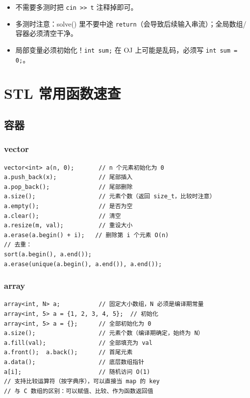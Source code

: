 \documentclass[UTF8,openany,oneside,zihao=-4]{ctexbook}
\newcommand{\inputnewboard}[1]{%
  {%
    \lstset{basicstyle=\newboardcodefont\small}%
  }%
}
\begin{document}
\begin{tip}
\begin{itemize}
  \item 不需要多测时把 \lstinline|cin >> t| 注释掉即可。
  \item 多测时注意：solve() 里不要中途 \lstinline|return|（会导致后续输入串流）；全局数组/容器必须清空干净。
  \item 局部变量必须初始化！\lstinline|int sum;| 在 OJ 上可能是乱码，必须写 \lstinline|int sum = 0;|。
\end{itemize}
\end{tip}

\inputnewboard{remake/large/01_模板.tex}

\chapter{STL 常用函数速查}

\section{容器}

\subsection{vector}
\begin{lstlisting}
vector<int> a(n, 0);       // n 个元素初始化为 0
a.push_back(x);            // 尾部插入
a.pop_back();              // 尾部删除
a.size();                  // 元素个数（返回 size_t，比较时注意）
a.empty();                 // 是否为空
a.clear();                 // 清空
a.resize(m, val);          // 重设大小
a.erase(a.begin() + i);   // 删除第 i 个元素 O(n)
// 去重：
sort(a.begin(), a.end());
a.erase(unique(a.begin(), a.end()), a.end());
\end{lstlisting}

\subsection{array}
\begin{lstlisting}
array<int, N> a;           // 固定大小数组，N 必须是编译期常量
array<int, 5> a = {1, 2, 3, 4, 5};  // 初始化
array<int, 5> a = {};      // 全部初始化为 0
a.size();                  // 元素个数（编译期确定，始终为 N）
a.fill(val);               // 全部填充为 val
a.front();  a.back();      // 首尾元素
a.data();                  // 底层数组指针
a[i];                      // 随机访问 O(1)
// 支持比较运算符（按字典序），可以直接当 map 的 key
// 与 C 数组的区别：可以赋值、比较、作为函数返回值
\end{lstlisting}
\end{document}
